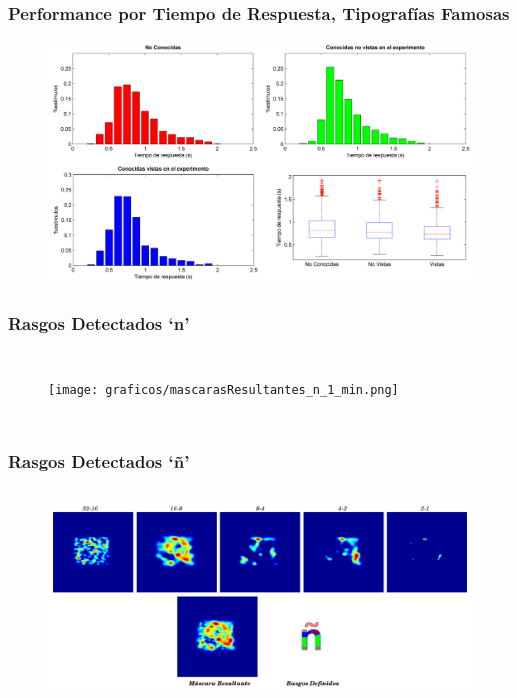 \documentclass[10pt]{beamer}
\begin{document}
   	\begin{frame}
	\frametitle{Performance por Tiempo de Respuesta, Tipografías Famosas}
	    \begin{figure}
		\includegraphics[width=\textwidth]{graficos/tiempoRespuesta_PorFamosas.png}
	    \end{figure}
	\end{frame}

	\begin{frame}
	\frametitle{Rasgos Detectados `n'}
	    \begin{columns}[t]
		\begin{figure}
		    \texttt{[image: graficos/mascarasResultantes\_n\_1\_min.png]}
		\end{figure}
	    \end{columns}
	\end{frame}


 	\begin{frame}
	\frametitle{Rasgos Detectados `\~n'}
	    \begin{columns}[t]
	    \column{1\textwidth}
		\begin{figure}
		    \includegraphics[width=\textwidth]{graficos/mascarasResultantes_enie_1_min.png}
		\end{figure}
	    \end{columns}
	\end{frame}
\end{document}
